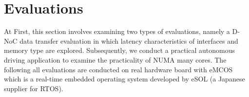 \documentclass[conference,compsoc]{IEEEtran}
\newcommand{\comment}[1]{}
\begin{document}







\vspace{-2mm}
\section{Evaluations}
\label{sec:evaluations}
\vspace{-3mm}
At First, this section involves examining two types of evaluations, namely a D-NoC data transfer evaluation in which latency characteristics of interfaces and memory type are explored.
Subsequently, we conduct a practical autonomous driving application to examine the practicality of NUMA many cores.
The following all evaluations are conducted on real hardware board with eMCOS which is a real-time embedded operating system developed by eSOL (a Japanese supplier for RTOS).
\end{document}
